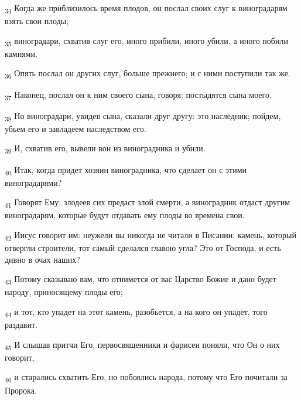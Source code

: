 \begin{tcolorbox}
\textsubscript{34} Когда же приблизилось время плодов, он послал своих слуг к виноградарям взять свои плоды;
\end{tcolorbox}
\begin{tcolorbox}
\textsubscript{35} виноградари, схватив слуг его, иного прибили, иного убили, а иного побили камнями.
\end{tcolorbox}
\begin{tcolorbox}
\textsubscript{36} Опять послал он других слуг, больше прежнего; и с ними поступили так же.
\end{tcolorbox}
\begin{tcolorbox}
\textsubscript{37} Наконец, послал он к ним своего сына, говоря: постыдятся сына моего.
\end{tcolorbox}
\begin{tcolorbox}
\textsubscript{38} Но виноградари, увидев сына, сказали друг другу: это наследник; пойдем, убьем его и завладеем наследством его.
\end{tcolorbox}
\begin{tcolorbox}
\textsubscript{39} И, схватив его, вывели вон из виноградника и убили.
\end{tcolorbox}
\begin{tcolorbox}
\textsubscript{40} Итак, когда придет хозяин виноградника, что сделает он с этими виноградарями?
\end{tcolorbox}
\begin{tcolorbox}
\textsubscript{41} Говорят Ему: злодеев сих предаст злой смерти, а виноградник отдаст другим виноградарям, которые будут отдавать ему плоды во времена свои.
\end{tcolorbox}
\begin{tcolorbox}
\textsubscript{42} Иисус говорит им: неужели вы никогда не читали в Писании: камень, который отвергли строители, тот самый сделался главою угла? Это от Господа, и есть дивно в очах наших?
\end{tcolorbox}
\begin{tcolorbox}
\textsubscript{43} Потому сказываю вам, что отнимется от вас Царство Божие и дано будет народу, приносящему плоды его;
\end{tcolorbox}
\begin{tcolorbox}
\textsubscript{44} и тот, кто упадет на этот камень, разобьется, а на кого он упадет, того раздавит.
\end{tcolorbox}
\begin{tcolorbox}
\textsubscript{45} И слышав притчи Его, первосвященники и фарисеи поняли, что Он о них говорит,
\end{tcolorbox}
\begin{tcolorbox}
\textsubscript{46} и старались схватить Его, но побоялись народа, потому что Его почитали за Пророка.
\end{tcolorbox}
